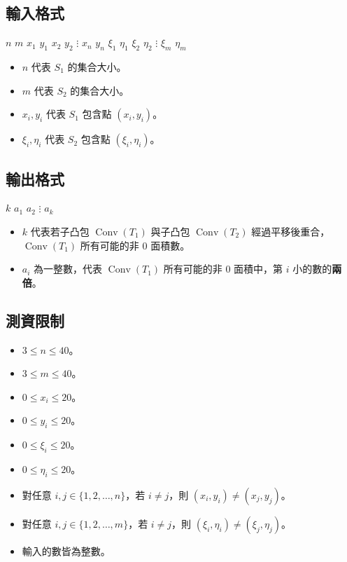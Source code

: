 \subsection{輸入格式}

\begin{format}
\f{
$n$ $m$
$x_1$ $y_1$
$x_2$ $y_2$
$\vdots$
$x_n$ $y_n$
$\xi_1$ $\eta_1$
$\xi_2$ $\eta_2$
$\vdots$
$\xi_m$ $\eta_m$
}
\end{format}

\begin{itemize}
\tightlist
\item
  \(n\) 代表 \(S_1\) 的集合大小。
\item
  \(m\) 代表 \(S_2\) 的集合大小。
\item
  \(x_i, y_i\) 代表 \(S_1\) 包含點 \((x_i, y_i)\)。
\item
  \(\xi_i, \eta_i\) 代表 \(S_2\) 包含點 \((\xi_i, \eta_i)\)。
\end{itemize}

\subsection{輸出格式}

\begin{format}
\f{
$k$
$a_1$
$a_2$
$\vdots$
$a_k$
}
\end{format}

\begin{itemize}
\tightlist
\item
  \(k\) 代表若子凸包 \(\operatorname{Conv}(T_1)\) 與子凸包
  \(\operatorname{Conv}(T_2)\)
  經過平移後重合，\(\operatorname{Conv}(T_1)\) 所有可能的非 \(0\)
  面積數。
\item
  \(a_i\) 為一整數，代表 \(\operatorname{Conv}(T_1)\) 所有可能的非 \(0\)
  面積中，第 \(i\) 小的數的\textbf{兩倍}。
\end{itemize}

\subsection{測資限制}

\begin{itemize}
\tightlist
\item
  \(3 \le n \le 40\)。
\item
  \(3 \le m \le 40\)。
\item
  \(0 \le x_i \le 20\)。
\item
  \(0 \le y_i \le 20\)。
\item
  \(0 \le \xi_i \le 20\)。
\item
  \(0 \le \eta_i \le 20\)。
\item
  對任意 \(i, j \in \{1, 2, \ldots, n\}\)，若 \(i \ne j\)，則
  \((x_i, y_i) \ne (x_j, y_j)\)。
\item
  對任意 \(i, j \in \{1, 2, \ldots, m\}\)，若 \(i \ne j\)，則
  \((\xi_i, \eta_i) \ne (\xi_j, \eta_j)\)。
\item
  輸入的數皆為整數。
\end{itemize}

